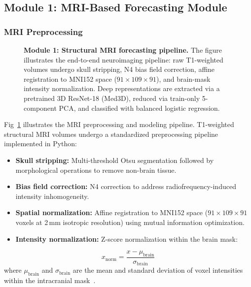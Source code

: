 \documentclass[10pt,letterpaper]{article}
\begin{document}
        \subsection*{Module 1: MRI-Based Forecasting Module}

        \subsubsection*{\textbf{MRI Preprocessing}}

        \begin{figure}[!h]
        \caption{\textbf{Module 1: Structural MRI forecasting pipeline.}
        The figure illustrates the end-to-end neuroimaging pipeline: raw T1-weighted volumes undergo skull stripping, N4 bias field correction, affine registration to MNI152 space ($91 \times 109 \times 91$), and brain-mask intensity normalization. Deep representations are extracted via a pretrained 3D ResNet-18 (Med3D), reduced via train-only 5-component PCA, and classified with balanced logistic regression.}
        \label{fig:module1}
        \end{figure}

        Fig~\ref{fig:module1} illustrates the MRI preprocessing and modeling pipeline.
        T1-weighted structural MRI volumes undergo a standardized preprocessing pipeline implemented in Python:
        \begin{itemize}
            \item \textbf{Skull stripping:} Multi-threshold Otsu segmentation followed by morphological operations to remove non-brain tissue.
            \item \textbf{Bias field correction:} N4 correction to address radiofrequency-induced intensity inhomogeneity.
            \item \textbf{Spatial normalization:} Affine registration to MNI152 space ($91 \times 109 \times 91$ voxels at 2\,mm isotropic resolution) using mutual information optimization.
            \item \textbf{Intensity normalization:} Z-score normalization within the brain mask:
        \end{itemize}

        \begin{equation} \label{eq_rob:1}
        x_{\text{norm}} = \frac{x - \mu_{\text{brain}}}{\sigma_{\text{brain}}}
        \end{equation}
        where $\mu_{\text{brain}}$ and $\sigma_{\text{brain}}$ are the mean and standard deviation of voxel intensities within the intracranial mask~\cite{ref47}.
\end{document}
